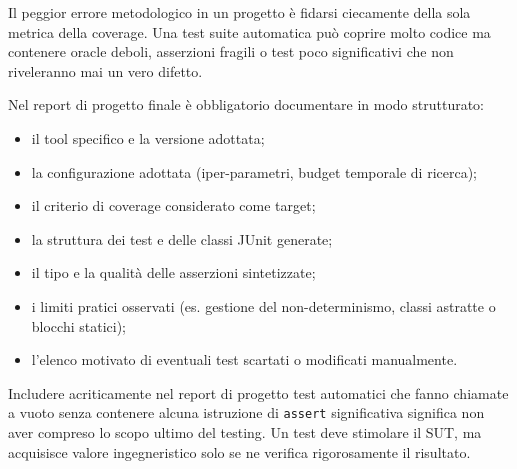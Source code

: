 \begin{notaesame}

Il peggior errore metodologico in un progetto è fidarsi ciecamente della sola metrica della coverage. Una test suite automatica può coprire molto codice ma contenere oracle deboli, asserzioni fragili o test poco significativi che non riveleranno mai un vero difetto.

\end{notaesame}

Nel report di progetto finale è obbligatorio documentare in modo strutturato:

\begin{itemize}

\item il tool specifico e la versione adottata;

\item la configurazione adottata (iper-parametri, budget temporale di ricerca);

\item il criterio di coverage considerato come target;

\item la struttura dei test e delle classi JUnit generate;

\item il tipo e la qualità delle asserzioni sintetizzate;

\item i limiti pratici osservati (es. gestione del non-determinismo, classi astratte o blocchi statici);

\item l'elenco motivato di eventuali test scartati o modificati manualmente.

\end{itemize}

\begin{notaprof}

Includere acriticamente nel report di progetto test automatici che fanno chiamate a vuoto senza contenere alcuna istruzione di \texttt{assert} significativa significa non aver compreso lo scopo ultimo del testing. Un test deve stimolare il SUT, ma acquisisce valore ingegneristico solo se ne verifica rigorosamente il risultato.

\end{notaprof}

